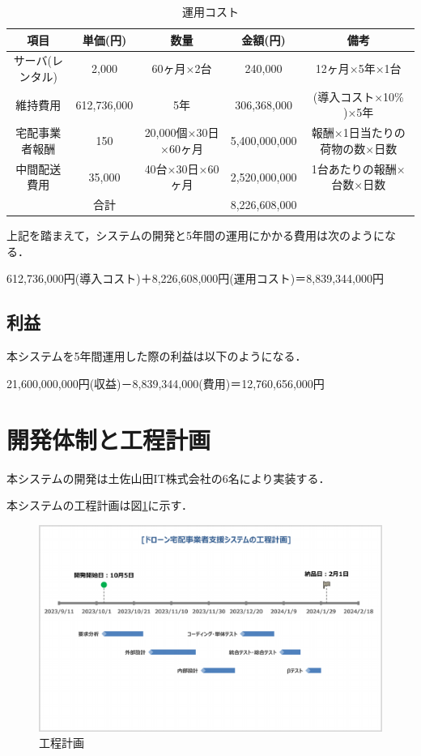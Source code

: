 \documentclass[a4paper, titlepage]{jsarticle}
\begin{document}
\begin{table}[htbp]
    \centering
    \begin{tabular}{c c c c c}
    \hline
    項目 & 単価(円) & 数量 & 金額(円) & 備考 \\
    \hline \hline
    サーバ(レンタル) & 2,000 & 60ヶ月×2台 & 240,000 & 12ヶ月×5年×1台 \\
    維持費用 & 612,736,000 & 5年 & 306,368,000 & (導入コスト×10\% )×5年 \\
    宅配事業者報酬 & 150 & 20,000個×30日×60ヶ月 & 5,400,000,000 & 報酬×1日当たりの荷物の数×日数 \\
    中間配送費用 & 35,000 & 40台×30日×60ヶ月 & 2,520,000,000 & 1台あたりの報酬×台数×日数 \\
    \hline \hline
     & 合計 &  & 8,226,608,000 &  \\
    \hline
    \end{tabular}
    \caption{運用コスト}
    \label{tab:label2}
\end{table}

上記を踏まえて，システムの開発と5年間の運用にかかる費用は次のようになる．
\begin{center}
    612,736,000円(導入コスト)＋8,226,608,000円(運用コスト)＝8,839,344,000円
\end{center}

\subsection{利益}
本システムを5年間運用した際の利益は以下のようになる．
\begin{center}
    21,600,000,000円(収益)－8,839,344,000(費用)＝12,760,656,000円
\end{center}

\section{開発体制と工程計画}
本システムの開発は土佐山田IT株式会社の6名により実装する．

本システムの工程計画は図\ref{fig:schedule}に示す．
\begin{figure}[htbp]
        \centering
        \label{fig:schedule}
        \includegraphics[width=15cm]{schedule.pdf}
        \caption{工程計画}
\end{figure}
\end{document}
